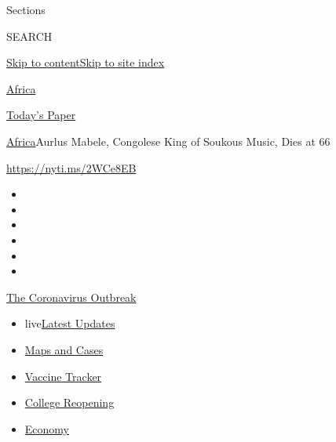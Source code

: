 Sections

SEARCH

\protect\hyperlink{site-content}{Skip to
content}\protect\hyperlink{site-index}{Skip to site index}

\href{https://www.nytimes3xbfgragh.onion/section/world/africa}{Africa}

\href{https://myaccount.nytimes3xbfgragh.onion/auth/login?response_type=cookie\&client_id=vi}{}

\href{https://www.nytimes3xbfgragh.onion/section/todayspaper}{Today's
Paper}

\href{/section/world/africa}{Africa}\textbar{}Aurlus Mabele, Congolese
King of Soukous Music, Dies at 66

\url{https://nyti.ms/2WCe8EB}

\begin{itemize}
\item
\item
\item
\item
\item
\item
\end{itemize}

\href{https://www.nytimes3xbfgragh.onion/news-event/coronavirus?action=click\&pgtype=Article\&state=default\&region=TOP_BANNER\&context=storylines_menu}{The
Coronavirus Outbreak}

\begin{itemize}
\tightlist
\item
  live\href{https://www.nytimes3xbfgragh.onion/2020/08/04/world/coronavirus-covid-19.html?action=click\&pgtype=Article\&state=default\&region=TOP_BANNER\&context=storylines_menu}{Latest
  Updates}
\item
  \href{https://www.nytimes3xbfgragh.onion/interactive/2020/us/coronavirus-us-cases.html?action=click\&pgtype=Article\&state=default\&region=TOP_BANNER\&context=storylines_menu}{Maps
  and Cases}
\item
  \href{https://www.nytimes3xbfgragh.onion/interactive/2020/science/coronavirus-vaccine-tracker.html?action=click\&pgtype=Article\&state=default\&region=TOP_BANNER\&context=storylines_menu}{Vaccine
  Tracker}
\item
  \href{https://www.nytimes3xbfgragh.onion/2020/08/02/us/covid-college-reopening.html?action=click\&pgtype=Article\&state=default\&region=TOP_BANNER\&context=storylines_menu}{College
  Reopening}
\item
  \href{https://www.nytimes3xbfgragh.onion/live/2020/08/03/business/stock-market-today-coronavirus?action=click\&pgtype=Article\&state=default\&region=TOP_BANNER\&context=storylines_menu}{Economy}
\end{itemize}

